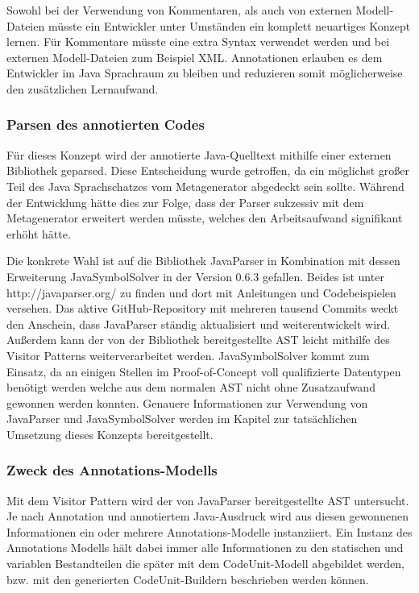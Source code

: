 \documentclass[12pt,oneside,a4paper,parskip]{scrbook}
\begin{document}
Sowohl bei der Verwendung von Kommentaren, als auch von externen Modell-Dateien müsste ein Entwickler unter Umständen ein komplett neuartiges Konzept lernen. Für Kommentare müsste eine extra Syntax verwendet werden und bei externen Modell-Dateien zum Beispiel XML. Annotationen erlauben es dem Entwickler im Java Sprachraum zu bleiben und reduzieren somit möglicherweise den zusätzlichen Lernaufwand.

\subsubsection{Parsen des annotierten Codes}

Für dieses Konzept wird der annotierte Java-Quelltext mithilfe einer externen Bibliothek geparsed. Diese Entscheidung wurde getroffen, da ein möglichst großer Teil des Java Sprachschatzes vom Metagenerator abgedeckt sein sollte. Während der Entwicklung hätte dies zur Folge, dass der Parser sukzessiv mit dem Metagenerator erweitert werden müsste, welches den Arbeitsaufwand signifikant erhöht hätte.

Die konkrete Wahl ist auf die Bibliothek JavaParser in Kombination mit dessen Erweiterung JavaSymbolSolver in der Version 0.6.3 gefallen. Beides ist unter http://javaparser.org/ zu finden und dort mit Anleitungen und Codebeispielen versehen. Das aktive GitHub-Repository mit mehreren tausend Commits weckt den Anschein, dass JavaParser ständig aktualisiert und weiterentwickelt wird. Außerdem kann der von der Bibliothek bereitgestellte AST leicht mithilfe des Visitor Patterns weiterverarbeitet werden. JavaSymbolSolver kommt zum Einsatz, da an einigen Stellen im Proof-of-Concept voll qualifizierte Datentypen benötigt werden welche aus dem normalen AST nicht ohne Zusatzaufwand gewonnen werden konnten. Genauere Informationen zur Verwendung von JavaParser und JavaSymbolSolver werden im Kapitel zur tatsächlichen Umsetzung dieses Konzepts bereitgestellt.

\subsubsection{Zweck des Annotations-Modells}

Mit dem Visitor Pattern wird der von JavaParser bereitgestellte AST untersucht. Je nach Annotation und annotiertem Java-Ausdruck wird aus diesen gewonnenen Informationen ein oder mehrere Annotations-Modelle instanziiert. Ein Instanz des Annotations Modells hält dabei immer alle Informationen zu den statischen und variablen Bestandteilen die später mit dem CodeUnit-Modell abgebildet werden, bzw. mit den generierten CodeUnit-Buildern beschrieben werden können. 
\end{document}
